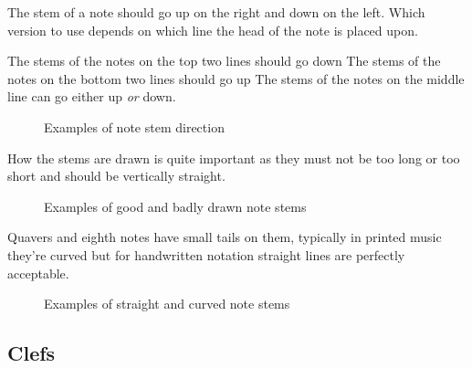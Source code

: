 The stem of a note should go up on the right and down on the left. Which version to use depends on which line the head of the note is placed upon.

The stems of the notes on the top two lines should go down
The stems of the notes on the bottom two lines should go up
The stems of the notes on the middle line can go either up \emph{or} down.

\begin{figure}[h!]
  \centering
  \caption{Examples of note stem direction}
  \label{fig:StemsChromatic}
\end{figure}

How the stems are drawn is quite important as they must not be too long or too short and should be vertically straight.

\begin{figure}[h!]
  \centering
  \caption{Examples of good and badly drawn note stems}
  \label{fig:StemsGoodBad}
\end{figure}

Quavers and eighth notes have small tails on them, typically in printed music they're curved but for handwritten notation straight lines are perfectly acceptable.

\begin{figure}[h!]
  \centering
  \caption{Examples of straight and curved note stems}
  \label{fig:StemsStraightCurved}
\end{figure}

\subsection*{Clefs}

